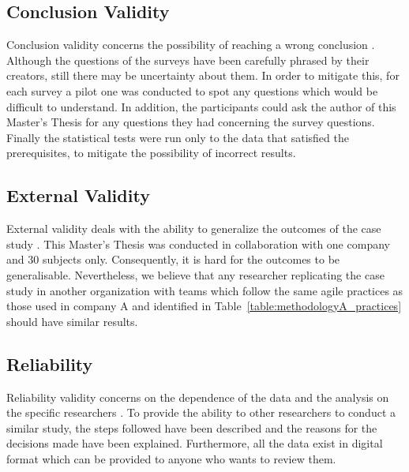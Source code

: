 \subsection{Conclusion Validity}
Conclusion validity concerns the possibility of reaching a wrong conclusion \cite{Wohlin}. Although the questions of the surveys have been carefully phrased by their creators, still there may be uncertainty about them. In order to mitigate this, for each survey a pilot one was conducted to spot any questions which would be difficult to understand. In addition, the participants could ask the author of this Master's Thesis for any questions they had concerning the survey questions. Finally the statistical tests were run only to the data that satisfied the prerequisites, to mitigate the possibility of incorrect results. %

\subsection{External Validity}
External validity deals with the ability to generalize the outcomes of the case study \cite{Wohlin}. This Master's Thesis was conducted in collaboration with one company and 30 subjects only. Consequently, it is hard for the outcomes to be generalisable. Nevertheless, we believe that any researcher replicating the case study in another organization with teams which follow the same agile practices as those used in company A and identified in Table~\ref{table:methodologyA_practices} should have similar results.

\subsection{Reliability}
Reliability validity concerns on the dependence of the data and the analysis on the specific researchers \cite{Wohlin}. To provide the ability to other researchers to conduct a similar study, the steps followed have been described and the reasons for the decisions made have been explained. Furthermore, all the data exist in digital format which can be provided to anyone who wants to review them. %




